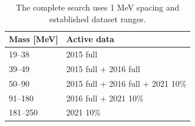 \begin{table}[H]\centering\small
\begin{tabular}{ll}\toprule
Mass [MeV] & Active data\\\midrule
19--38 & 2015 full \\
39--49 & 2015 full + 2016 full \\
50--90 & 2015 full + 2016 full + 2021 10\% \\
91--180 & 2016 full + 2021 10\% \\
181--250 & 2021 10\% \\
\bottomrule\end{tabular}
\caption{The complete search uses 1 MeV spacing and established dataset ranges.}\end{table}

